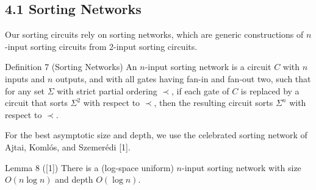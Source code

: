 \subsection*{4.1 Sorting Networks}
Our sorting circuits rely on sorting networks, which are generic constructions of $n$-input sorting circuits from 2-input sorting circuits.
\begin{originalresult}{Definition 7 (Sorting Networks)}
An $n$-input sorting network is a circuit $C$ with $n$ inputs and $n$ outputs, and with all gates having fan-in and fan-out two, such that for any set $\Sigma$ with strict partial ordering $\prec$, if each gate of $C$ is replaced by a circuit that sorts $\Sigma^2$ with respect to $\prec$, then the resulting circuit sorts $\Sigma^n$ with respect to $\prec$.
\end{originalresult}
For the best asymptotic size and depth, we use the celebrated sorting network of Ajtai, Koml\'os, and Szemer\'edi [1].
\begin{originalresult}{Lemma 8 ([1])}
There is a (log-space uniform) $n$-input sorting network with size $O(n\log n)$ and depth $O(\log n)$.
\end{originalresult}
